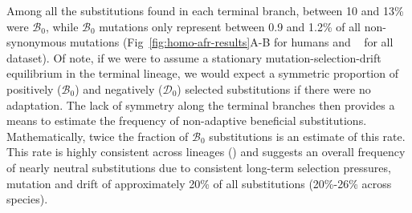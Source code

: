 \documentclass[10pt,letterpaper]{article}
\newcommand{\SphyDel}{\mathcal{D}_0}
\newcommand{\SphyBen}{\mathcal{B}_0}
\begin{document}
Among all the substitutions found in each terminal branch, between 10 and 13\% were $\SphyBen$, while $\SphyBen$ mutations only represent between 0.9 and 1.2\% of all non-synonymous mutations (Fig~\ref{fig:homo-afr-results}A-B for humans and ~ for all dataset).
Of note, if we were to assume a stationary mutation-selection-drift equilibrium in the terminal lineage, we would expect a symmetric proportion of positively ($\SphyBen$) and negatively ($\SphyDel$) selected substitutions if there were no adaptation.
The lack of symmetry along the terminal branches then provides a means to estimate the frequency of non-adaptive beneficial substitutions.
Mathematically, twice the fraction of $\SphyBen$ substitutions is an estimate of this rate.
This rate is highly consistent across lineages () and suggests an overall frequency of nearly neutral substitutions due to consistent long-term selection pressures, mutation and drift of approximately 20\% of all substitutions (20\%-26\% across species).
\end{document}
